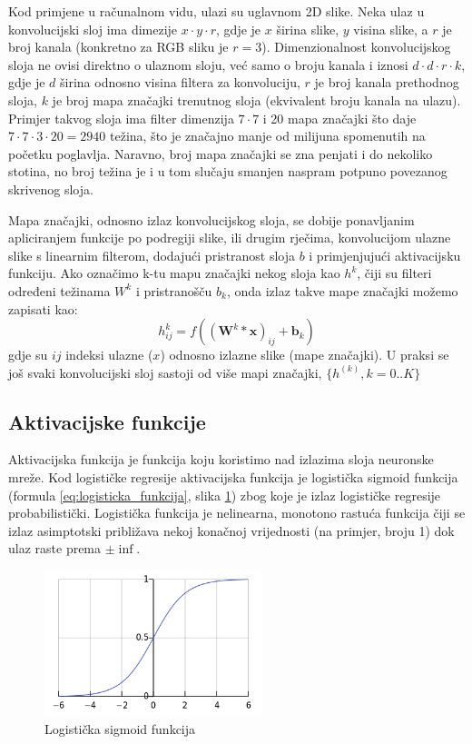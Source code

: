 \documentclass[times, utf8, diplomski, numeric]{fer}
\begin{document}
Kod primjene u računalnom vidu, ulazi su uglavnom 2D slike.
Neka ulaz u konvolucijski sloj ima dimezije $x \cdot y \cdot r$, gdje je $x$ širina slike, $y$ visina slike, a $r$ je broj kanala (konkretno za RGB sliku je $r = 3$). Dimenzionalnost konvolucijskog sloja ne ovisi direktno o ulaznom sloju, već samo o broju kanala i iznosi $d \cdot d \cdot r \cdot k$, gdje je $d$ širina odnosno visina filtera za konvoluciju, $r$ je broj kanala prethodnog sloja, $k$ je broj mapa značajki trenutnog sloja (ekvivalent broju kanala na ulazu). Primjer takvog sloja ima filter dimenzija $7 \cdot 7$ i 20 mapa značajki što daje $7 \cdot 7 \cdot 3 \cdot 20 = 2940$ težina, što je značajno manje od milijuna spomenutih na početku poglavlja. Naravno, broj mapa značajki se zna penjati i do nekoliko stotina, no broj težina je i u tom slučaju smanjen naspram potpuno povezanog skrivenog sloja.

Mapa značajki, odnosno izlaz konvolucijskog sloja, se dobije ponavljanim apliciranjem funkcije po podregiji slike, ili drugim rječima, konvolucijom ulazne slike s linearnim filterom, dodajući pristranost sloja $b$ i primjenjujući aktivacijsku funkciju. Ako označimo k-tu mapu značajki nekog sloja kao $h^k$, čiji su filteri određeni težinama $W^k$ i pristranošču $b_k$, onda izlaz takve mape značajki možemo zapisati kao:
\begin{equation}
  h_{ij}^k = f \left( \left( \boldsymbol{W}^k * \boldsymbol{x} \right)_{ij} + \boldsymbol{b}_k \right)
\end{equation}
gdje su $ij$ indeksi ulazne ($x$) odnosno izlazne slike (mape značajki).
U praksi se još svaki konvolucijski sloj sastoji od više mapi značajki, $\{ h^{(k)}, k = 0..K \}$


\subsection{Aktivacijske funkcije}
\label{chap:aktivacijske_funkcije}

Aktivacijska funkcija je funkcija koju koristimo nad izlazima sloja neuronske mreže. %
Kod logističke regresije aktivacijska funkcija je logistička sigmoid funkcija (formula \ref{eq:logisticka_funkcija}, slika \ref{fig:logistic_sigmoid}) zbog koje je izlaz logističke regresije probabilistički. Logistička funkcija je nelinearna, monotono rastuća funkcija čiji se izlaz asimptotski približava nekoj konačnoj vrijednosti (na primjer, broju 1) dok ulaz raste prema $\pm \inf$.

\begin{figure}[htb]
\centering
\includegraphics[width=240px]{imgs/logistic_curve.png}
\caption{Logistička sigmoid funkcija}
\label{fig:logistic_sigmoid}
\end{figure}
\end{document}
